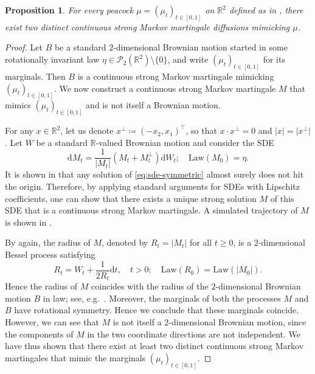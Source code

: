 \documentclass[12pt,oneside]{amsart}
\newtheorem{proposition}[theorem]{Proposition}
\theoremstyle{definition}
\newcommand{\Law}{\mathrm{Law}}
\newcommand{\D}{\mathrm{d}}
\newcommand{\R}{\mathbb R}
\def\R{{\mathbb R}}
\numberwithin{equation}{section}
\begin{document}
\begin{proposition}
	For every peacock $\mu = (\mu_t)_{t \in [0, 1]}$ on $\R^2$ defined as in , there exist two distinct continuous strong Markov martingale diffusions mimicking $\mu$.
\end{proposition}
\begin{proof}
	Let $B$ be a standard $2$-dimensional Brownian motion started in some rotationally invariant law $\eta \in \mathcal{P}_2(\R^2) \setminus \{0\}$, and write $(\mu_t)_{t \in [0, 1]}$ for its marginals. Then $B$ is a continuous strong Markov martingale mimicking $(\mu_t)_{t \in [0, 1]}$. We now construct a continuous strong Markov martingale $M$ that mimics $(\mu_t)_{t \in [0, 1]}$ and is not itself a Brownian motion.
	
	For any $x \in \R^2$, let us denote $x^\perp \coloneqq (-x_2, x_1)^\top$, so that $x \cdot x^\perp = 0$ and $\lvert x \rvert = \lvert x^\perp \rvert$. Let $W$ be a standard $\R$-valued Brownian motion and consider the SDE
	\begin{equation}\label{eq:sde-symmetric}
		\D M_t = \frac{1}{\lvert M_t \rvert} (M_t + M^\perp_t) \D W_t; \quad \Law(M_0) = \eta.
	\end{equation}
	It is shown in \cite[Proposition 3.2]{CoRo22} that any solution of \eqref{eq:sde-symmetric} almost surely does not hit the origin. Therefore, by applying standard arguments for SDEs with Lipschitz coefficients, one can show that there exists a unique strong solution $M$ of this SDE that is a continuous strong Markov martingale. A simulated trajectory of $M$ is shown in .
	
	 By \cite[Proposition 3.2]{CoRo22} again, the radius of $M$, denoted by $R_t = \lvert M_t \rvert$ for all $t \geq 0$, is a $2$-dimensional Bessel process satisfying
	\begin{equation}
		R_t = W_t + \frac{1}{2 R_t}\D t, \quad t > 0; \quad \Law(R_0) = \Law(\lvert M_0\rvert).
	\end{equation}
	Hence the radius of $M$ coincides with the radius of the $2$-dimensional Brownian motion $B$ in law; see, e.g.~\cite[Chapter XI]{ReYo99}. Moreover, the marginals of both the processes $M$ and $B$ have rotational symmetry. Hence we conclude that these marginals coincide. However, we can see that $M$ is not itself a $2$-dimensional Brownian motion, since the components of $M$ in the two coordinate directions are not independent. We have thus shown that there exist at least two distinct continuous strong Markov martingales that mimic the marginals $(\mu_t)_{t \in [0, 1]}$.
\end{proof}
\end{document}
